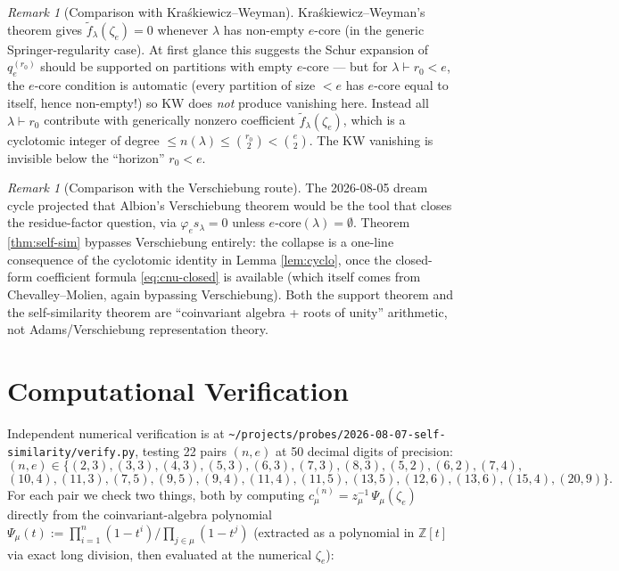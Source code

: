 \documentclass[11pt]{article}
\theoremstyle{remark}
\newtheorem{remark}[theorem]{Remark}
\newcommand{\ftilde}{\widetilde{f}}
\newcommand{\zetae}{\zeta_e}
\newcommand{\ZZ}{\mathbb{Z}}
\begin{document}
\begin{remark}[Comparison with Kra\'skiewicz--Weyman]
Kra\'skiewicz--Weyman's theorem \cite{KW01} gives $\ftilde_\lambda(\zetae) = 0$ whenever $\lambda$ has non-empty $e$-core (in the generic Springer-regularity case). At first glance this suggests the Schur expansion of $q_e^{(r_0)}$ should be supported on partitions with empty $e$-core --- but for $\lambda \vdash r_0 < e$, the $e$-core condition is automatic (every partition of size $< e$ has $e$-core equal to itself, hence non-empty!) so KW does \emph{not} produce vanishing here. Instead all $\lambda \vdash r_0$ contribute with generically nonzero coefficient $\ftilde_\lambda(\zetae)$, which is a cyclotomic integer of degree $\le n(\lambda) \le \binom{r_0}{2} < \binom{e}{2}$. The KW vanishing is invisible below the ``horizon'' $r_0 < e$.
\end{remark}

\begin{remark}[Comparison with the Verschiebung route]
The 2026-08-05 dream cycle projected that Albion's Verschiebung theorem \cite{Alb26} would be the tool that closes the residue-factor question, via $\varphi_e s_\lambda = 0$ unless $e$-core$(\lambda) = \emptyset$. Theorem \ref{thm:self-sim} bypasses Verschiebung entirely: the collapse is a one-line consequence of the cyclotomic identity in Lemma \ref{lem:cyclo}, once the closed-form coefficient formula \eqref{eq:cnu-closed} is available (which itself comes from Chevalley--Molien, again bypassing Verschiebung). Both the support theorem and the self-similarity theorem are ``coinvariant algebra + roots of unity'' arithmetic, not Adams/Verschiebung representation theory.
\end{remark}

\section{Computational Verification}\label{sec:verif}

Independent numerical verification is at \verb|~/projects/probes/2026-08-07-self-similarity/verify.py|, testing 22 pairs $(n, e)$ at 50 decimal digits of precision:
\[
  (n, e) \in \{(2,3), (3,3), (4,3), (5,3), (6,3), (7,3), (8,3), (5,2), (6,2), (7,4),
\]
\[
  (10,4), (11,3), (7,5), (9,5), (9,4), (11,4), (11,5), (13,5), (12,6), (13,6), (15,4), (20,9)\}.
\]
For each pair we check two things, both by computing $c_\mu^{(n)} = z_\mu^{-1}\, \Psi_\mu(\zetae)$ directly from the coinvariant-algebra polynomial $\Psi_\mu(t) := \prod_{i=1}^n(1-t^i)/\prod_{j \in \mu}(1-t^j)$ (extracted as a polynomial in $\ZZ[t]$ via exact long division, then evaluated at the numerical $\zetae$):
\end{document}
